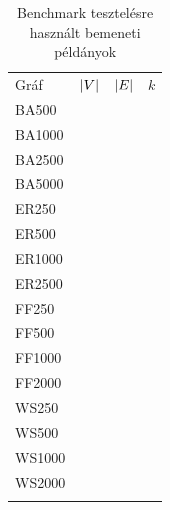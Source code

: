 \begin{table}[b]
  \centering
  \caption{Benchmark tesztelésre használt bemeneti példányok}\label{tab:BENCHMARK_INSTANCES}
  \begin{tabularx}{\textwidth} {
      >{\raggedright\arraybackslash}X
      >{\raggedleft\arraybackslash}X
      >{\raggedleft\arraybackslash}X
      >{\raggedleft\arraybackslash}X
    }
    \Xhline{4\arrayrulewidth}
    Gráf   & $\lvert V\rvert$ & $\lvert E\rvert$ & $k$ \\
    \Xhline{4\arrayrulewidth}
    BA500  & 500       & 499       & 50  \\
    BA1000 & 1000      & 999       & 75  \\
    BA2500 & 2500      & 2499      & 100 \\
    BA5000 & 5000      & 4999      & 150 \\
    \hline
    ER250  & 235       & 350       & 50  \\
    ER500  & 466       & 700       & 80  \\
    ER1000 & 941       & 1400      & 140 \\
    ER2500 & 2344      & 3500      & 200 \\
    \hline
    FF250  & 250       & 514       & 50  \\
    FF500  & 500       & 828       & 110 \\
    FF1000 & 1000      & 1817      & 150 \\
    FF2000 & 2000      & 3413      & 200 \\
    \hline
    WS250  & 250       & 1246      & 70  \\
    WS500  & 500       & 1496      & 125 \\
    WS1000 & 1000      & 4996      & 200 \\
    WS2000 & 1500      & 4498      & 265 \\
    \Xhline{4\arrayrulewidth}
  \end{tabularx}
\end{table}


